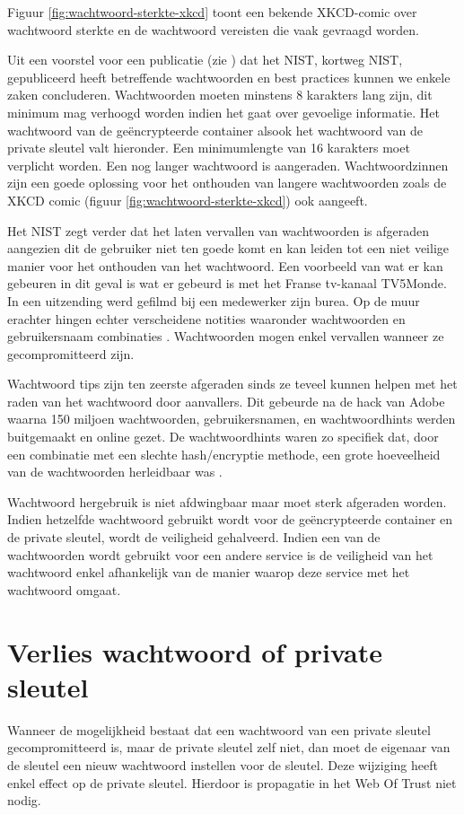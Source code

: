 Figuur \ref{fig:wachtwoord-sterkte-xkcd} toont een bekende XKCD-comic over
wachtwoord sterkte en de wachtwoord vereisten die vaak gevraagd worden.

Uit een voorstel voor een publicatie (zie
\textcite{NISTDigitalIdentityGuidelines}) dat het \acrlong{NIST}, kortweg
\acrshort{NIST}, gepubliceerd heeft betreffende
wachtwoorden en best practices kunnen we enkele zaken concluderen. Wachtwoorden
moeten minstens 8 karakters lang zijn, dit minimum mag verhoogd worden indien
het gaat over gevoelige informatie. Het wachtwoord van de geëncrypteerde
container alsook het wachtwoord van de private sleutel valt hieronder. Een
minimumlengte van 16 karakters moet verplicht worden. Een nog langer wachtwoord
is aangeraden. Wachtwoordzinnen zijn een goede oplossing voor het onthouden van
langere wachtwoorden zoals de XKCD comic (figuur
\ref{fig:wachtwoord-sterkte-xkcd}) ook aangeeft.

Het \acrshort{NIST} zegt verder dat het laten vervallen van wachtwoorden is
afgeraden
aangezien dit de gebruiker niet ten goede komt en kan leiden tot een niet
veilige manier voor het onthouden van het wachtwoord. Een voorbeeld van wat er
kan gebeuren in dit geval is wat er gebeurd is met het Franse tv-kanaal
TV5Monde. In een uitzending werd gefilmd bij een medewerker zijn burea. Op de
muur erachter hingen echter verscheidene notities waaronder wachtwoorden en
gebruikersnaam combinaties \autocite{MachkovechMonde}. Wachtwoorden mogen enkel
vervallen wanneer ze gecompromitteerd zijn.

Wachtwoord tips zijn ten zeerste afgeraden sinds ze teveel kunnen helpen met het
raden van het wachtwoord door aanvallers. Dit gebeurde na de hack van Adobe
waarna 150 miljoen wachtwoorden, gebruikersnamen, en wachtwoordhints werden
buitgemaakt en online gezet. De wachtwoordhints waren zo specifiek dat, door een
combinatie met een slechte \gls{hash}/encryptie methode, een grote hoeveelheid
van de
wachtwoorden herleidbaar was \autocite{HernGuardianAdobeLeak}.

Wachtwoord hergebruik is niet afdwingbaar maar moet sterk afgeraden worden.
Indien hetzelfde wachtwoord gebruikt wordt voor de geëncrypteerde container en
de private sleutel, wordt de veiligheid gehalveerd. Indien een van de
wachtwoorden wordt gebruikt voor een andere service is de veiligheid van het
wachtwoord enkel afhankelijk van de manier waarop deze service met het
wachtwoord omgaat.

\section{Verlies wachtwoord of private sleutel}
\label{sec:verlies-wachtwoord-of-private-sleutel}
Wanneer de mogelijkheid bestaat dat een wachtwoord van een private sleutel
gecompromitteerd is, maar de private sleutel zelf niet, dan moet de eigenaar van
de sleutel een nieuw wachtwoord instellen voor de sleutel. Deze wijziging heeft
enkel effect op de private sleutel. Hierdoor is propagatie in het Web Of Trust
niet nodig.

